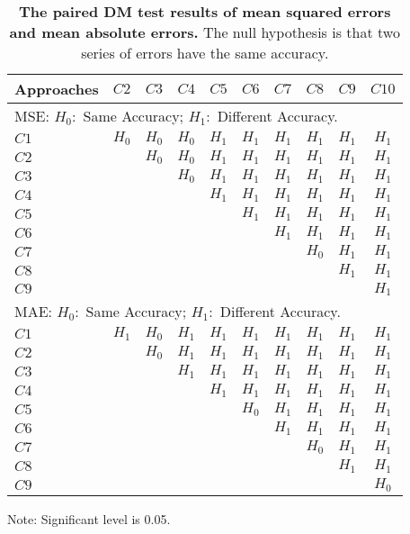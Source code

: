\begin{table}[ht]
\centering
\caption{{\bf The paired DM test results of mean squared errors and mean absolute errors.} The null hypothesis is that two series of errors have the same accuracy.\setlength{\baselineskip}{1.25em}}
\label{tab_summary_combinations_results_dmtest_mse_mae}
\setlength{\baselineskip}{1.25em}
\begin{threeparttable}
\begin{tabular}{lccccccccc}
\toprule\toprule
Approaches &$C2$  &$C3$  &$C4$  &$C5$  &$C6$  &$C7$  &$C8$  &$C9$  &$C10$\\
\hline
\multicolumn{10}{l}{MSE: $H_0:$ Same Accuracy; $H_1:$ Different Accuracy.}\\
$C1$       &$H_0$ &$H_0$ &$H_0$ &$H_1$ &$H_1$ &$H_1$ &$H_1$ &$H_1$ &$H_1$\\
$C2$       &      &$H_0$ &$H_0$ &$H_1$ &$H_1$ &$H_1$ &$H_1$ &$H_1$ &$H_1$\\
$C3$       &      &      &$H_0$ &$H_1$ &$H_1$ &$H_1$ &$H_1$ &$H_1$ &$H_1$\\
$C4$       &      &      &      &$H_1$ &$H_1$ &$H_1$ &$H_1$ &$H_1$ &$H_1$\\
$C5$       &      &      &      &      &$H_1$ &$H_1$ &$H_1$ &$H_1$ &$H_1$\\
$C6$       &      &      &      &      &      &$H_1$ &$H_1$ &$H_1$ &$H_1$\\
$C7$       &      &      &      &      &      &      &$H_0$ &$H_1$ &$H_1$\\
$C8$       &      &      &      &      &      &      &      &$H_1$ &$H_1$\\
$C9$       &      &      &      &      &      &      &      &      &$H_1$\\
\hline
\multicolumn{10}{l}{MAE: $H_0:$ Same Accuracy; $H_1:$ Different Accuracy.}\\
$C1$       &$H_1$ &$H_0$ &$H_1$ &$H_1$ &$H_1$ &$H_1$ &$H_1$ &$H_1$ &$H_1$\\
$C2$       &      &$H_0$ &$H_1$ &$H_1$ &$H_1$ &$H_1$ &$H_1$ &$H_1$ &$H_1$\\
$C3$       &      &      &$H_1$ &$H_1$ &$H_1$ &$H_1$ &$H_1$ &$H_1$ &$H_1$\\
$C4$       &      &      &      &$H_1$ &$H_1$ &$H_1$ &$H_1$ &$H_1$ &$H_1$\\
$C5$       &      &      &      &      &$H_0$ &$H_1$ &$H_1$ &$H_1$ &$H_1$\\
$C6$       &      &      &      &      &      &$H_1$ &$H_1$ &$H_1$ &$H_1$\\
$C7$       &      &      &      &      &      &      &$H_0$ &$H_1$ &$H_1$\\
$C8$       &      &      &      &      &      &      &      &$H_1$ &$H_1$\\
$C9$       &      &      &      &      &      &      &      &      &$H_0$\\
\bottomrule\bottomrule
\end{tabular}
Note: Significant level is 0.05.\setlength{\baselineskip}{1.25em}
\end{threeparttable}
\end{table}